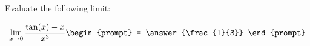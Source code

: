\documentclass{ximera}
\author{Steven Gubkin}
\begin{document}
\begin{exercise}

Evaluate the following limit:

\[
\lim_{x \to 0} \frac{\tan(x) - x}{x^3} \begin{prompt} = \answer{\frac{1}{3}} \end{prompt}
\]

\end{exercise}
\end{document}
